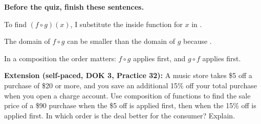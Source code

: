 
\vspace{6pt}
\textbf{Before the quiz, finish these sentences.}

To find $(f\circ g)(x)$, I substitute the inside function \blank[2.2cm] for $x$ in \blank[2.2cm].

The domain of $f\circ g$ can be smaller than the domain of $g$ because \blank[6cm].

In a composition the order matters: $f\circ g$ applies \blank[1.2cm] first, and $g\circ f$ applies \blank[1.2cm] first.

\vspace{4pt}
{\small\textbf{Extension (self-paced, DOK 3, Practice 32):} A music store takes \$5 off a purchase of \$20 or more, and you save an additional 15\% off your total purchase when you open a charge account. Use composition of functions to find the sale price of a \$90 purchase when the \$5 off is applied first, then when the 15\% off is applied first. In which order is the deal better for the consumer? Explain.}


